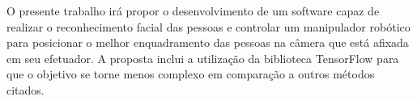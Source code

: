O presente trabalho irá propor o desenvolvimento de um software capaz de realizar o reconhecimento facial das pessoas e controlar um manipulador robótico para posicionar o melhor enquadramento das pessoas na câmera que está afixada em seu efetuador. A proposta inclui a utilização da biblioteca TensorFlow para que o objetivo se torne menos complexo em comparação a outros métodos citados.


